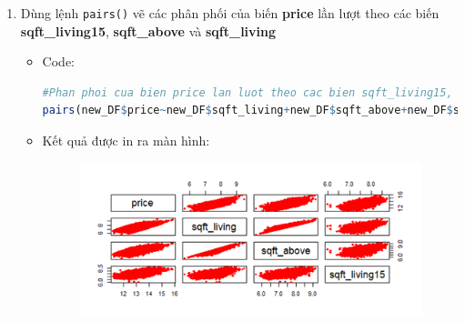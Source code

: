 \documentclass[a4paper]{article}
\theoremstyle{definition}
\begin{document}
\begin{itemize}
\begin{enumerate}
\begin{enumerate}
\begin{itemize}
            \begin{center}
            \textbf{Hình 5: }\textit{Phân phối biến price theo từng nhóm phân loại của biến condition}
            \end{center}
            
        \end{itemize}
        Nhận xét:
        \begin{itemize}
            \item Giá nhà tuy có trung vị khá ổn định trong mỗi mô hình, song lại tồn tại rất nhiều Outliers gây ra sự ngẫu nhiên. Vì vậy, Price và floors hoặc condition đều không có mối tương quan hồi quy đơn.
           
            \item Tại các điểm như floors = 1 hoặc condition = 3, các điểm ngoại lai xuất hiện với tần số lớn hơn thể hiện sự tương quan của biến giá nhà với các biến còn lại chưa được xét đến trong mỗi đồ thị đơn.
        \end{itemize}
    
        \item Dùng lệnh \texttt{pairs()} vẽ các phân phối của biến \textbf{price} lần lượt theo các biến \textbf{sqft\_living15}, \textbf{sqft\_above} và \textbf{sqft\_living}
        
        \begin{itemize}
            \item Code:
            
            \begin{lstlisting}[language=R, caption=Code for question 3f]
#Phan phoi cua bien price lan luot theo cac bien sqft_living15, sqft_above va sqft_living
pairs(new_DF$price~new_DF$sqft_living+new_DF$sqft_above+new_DF$sqft_living15, col="red", pch = 18, labels = c("price", "sqft_living","sqft_above","sqft_living15")) 
            \end{lstlisting} 
            
            \item Kết quả được in ra màn hình:
            \begin{figure}[H]
                \centering
                \includegraphics[scale = 0.8]{3f.png}
                \label{fig:my_label}
            \end{figure}
            

\end{itemize}
\end{enumerate}
\end{enumerate}
\end{itemize}
\end{document}
